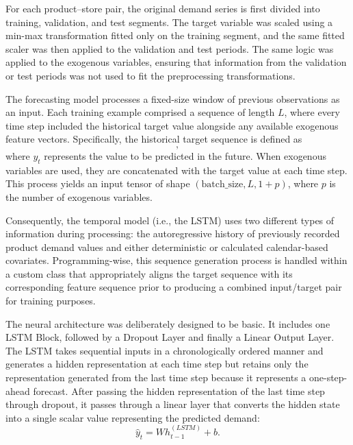 For each product--store pair, the original demand series is first divided into training, validation, and test segments. The target variable was scaled using a min-max transformation fitted only on the training segment, and the same fitted scaler was then applied to the validation and test periods. The same logic was applied to the exogenous variables, ensuring that information from the validation or test periods was not used to fit the preprocessing transformations.

The forecasting model processes a fixed-size window of previous observations as an input. Each training example comprised a sequence of length $L$, where every time step included the historical target value alongside any available exogenous feature vectors. Specifically, the historical target sequence is defined as
\begin{equation}
    [y_{t-L}, y_{t-L+1}, \dots, y_{t-1}],
    \label{eq:input_target_sequence}
\end{equation}
where $y_t$ represents the value to be predicted in the future. When exogenous variables are used, they are concatenated with the target value at each time step. This process yields an input tensor of shape $(\text{batch\_size}, L, 1+p)$, where $p$ is the number of exogenous variables. 

Consequently, the temporal model (i.e., the LSTM) uses two different types of information during processing: the autoregressive history of previously recorded product demand values and either deterministic or calculated calendar-based covariates. Programming-wise, this sequence generation process is handled within a custom class that appropriately aligns the target sequence with its corresponding feature sequence prior to producing a combined input/target pair for training purposes.

The neural architecture was deliberately designed to be basic. It includes one LSTM Block, followed by a Dropout Layer and finally a Linear Output Layer. The LSTM takes sequential inputs in a chronologically ordered manner and generates a hidden representation at each time step but retains only the representation generated from the last time step because it represents a one-step-ahead forecast. After passing the hidden representation of the last time step through dropout, it passes through a linear layer that converts the hidden state into a single scalar value representing the predicted demand:
\[
\hat{y}_t = W h_{t-1}^{(LSTM)} + b.
\]

